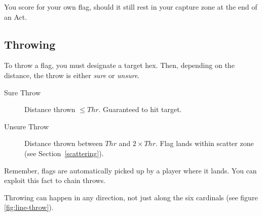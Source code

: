 \begin{note}
    You score for your own flag, should it still rest in your capture zone at the end of an Act.
\end{note}

\subsection{Throwing}\label{throwing}
To throw a flag, you must designate a target hex.
Then, depending on the distance, the throw is either \textit{sure} or \textit{unsure}.

\begin{description}
    \item[Sure Throw] Distance thrown $\leq Thr$. Guaranteed to hit target.
    \item[Unsure Throw] Distance thrown between $Thr$ and $2\times Thr$. Flag lands within scatter zone (see Section~\ref{scattering}).
\end{description}

Remember, flags are automatically picked up by a player where it lands. You can exploit this fact to chain throws.

\begin{note}
    Throwing can happen in any direction, not just along the six cardinals (see figure \ref{fig:line-throw}).
\end{note}

